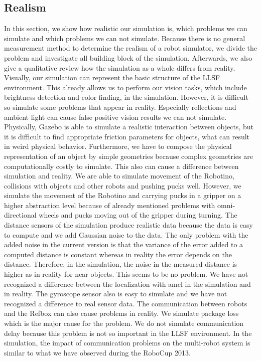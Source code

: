 \subsection{Realism}
In this section, we show how realistic our simulation is, which problems we can simulate and which problems we can not simulate. Because there is no general measurement method to determine the realism of a robot simulator, we divide the problem and investigate all building block of the simulation. Afterwards, we also give a qualitative review how the simulation as a whole differs from reality.\\
Visually, our simulation can represent the basic structure of the LLSF environment. This already allows us to perform our vision tasks, which include brightness detection and color finding, in the simulation. However, it is difficult so simulate some problems that appear in reality. Especially reflections and ambient light can cause false positive vision results we can not simulate. Physically, Gazebo is able to simulate a realistic interaction between objects, but it is difficult to find appropriate friction parameters for objects, what can result in weird physical behavior. Furthermore, we have to compose the physical representation of an object by simple geometries because complex geometries are computationally costly to simulate. This also can cause a difference between simulation and reality. We are able to simulate movement of the Robotino, collisions with objects and other robots and pushing pucks well. However, we simulate the movement of the Robotino and carrying pucks in a gripper on a higher abstraction level because of already mentioned problems with omni-directional wheels and pucks moving out of the gripper during turning. The distance sensors of the simulation produce realistic data because the data is easy to compute and we add Gaussian noise to the data. The only problem with the added noise in the current version is that the variance of the error added to a computed distance is constant whereas in reality the error depends on the distance. Therefore, in the simulation, the noise in the measured distance is higher as in reality for near objects. This seems to be no problem. We have not recognized a difference between the localization with amcl in the simulation and in reality. The gyroscope sensor also is easy to simulate and we have not recognized a difference to real sensor data. The communication between robots and the Refbox can also cause problems in reality. We simulate package loss which is the major cause for the problem. We do not simulate communication delay because this problem is not so important in the LLSF environment. In the simulation, the impact of communication problems on the multi-robot system is similar to what we have observed during the RoboCup 2013.\\
